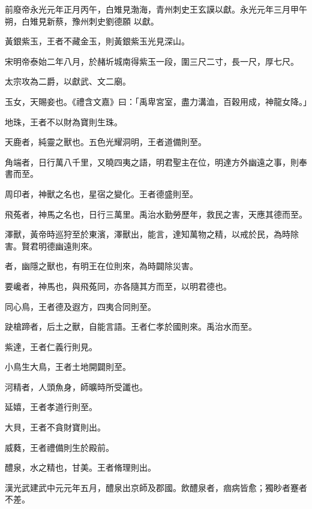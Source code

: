 \begin{pinyinscope}
 前廢帝永光元年正月丙午，白雉見渤海，青州刺史王玄謨以獻。永光元年三月甲午朔，白雉見新蔡，豫州刺史劉德願
 以獻。



 黃銀紫玉，王者不藏金玉，則黃銀紫玉光見深山。



 宋明帝泰始二年八月，於赭圻城南得紫玉一段，圍三尺二寸，長一尺，厚七尺。



 太宗攻為二爵，以獻武、文二廟。


玉女，天賜妾也。《禮含文嘉》曰：「禹卑宮室，盡力溝洫，百穀用成，神龍女降。」


地珠，王者不以財為寶則生珠。


天鹿者，純靈之獸也。五色光耀洞明，王者道備則至。


角端者，日行萬八千里，又曉四夷之語，明君聖主在位，明達方外幽遠之事，則奉書而至。


周印者，神獸之名也，星宿之變化。王者德盛則至。


飛菟者，神馬之名也，日行三萬里。禹治水勤勞歷年，救民之害，天應其德而至。


澤獸，黃帝時巡狩至於東濱，澤獸出，能言，達知萬物之精，以戒於民，為時除害。賢君明德幽遠則來。


者，幽隱之獸也，有明王在位則來，為時闢除災害。


要巉者，神馬也，與飛菟同，亦各隨其方而至，以明君德也。


同心鳥，王者德及遐方，四夷合同則至。


趹槍蹄者，后土之獸，自能言語。王者仁孝於國則來。禹治水而至。


紫達，王者仁義行則見。


小鳥生大鳥，王者土地開闢則至。


河精者，人頭魚身，師曠時所受讖也。


延嬉，王者孝道行則至。


大貝，王者不貪財寶則出。


威蕤，王者禮備則生於殿前。



 醴泉，水之精也，甘美。王者脩理則出。



 漢光武建武中元元年五月，醴泉出京師及郡國。飲醴泉者，痼病皆愈；獨眇者蹇者不差。




\end{pinyinscope}
